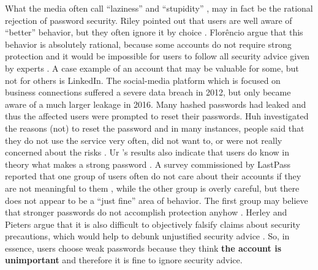 	What the media often call ``laziness'' and ``stupidity'' \cite{Volkamer2013MentalModels}, may in fact be the rational rejection of password security. Riley pointed out that users are well aware of ``better'' behavior, but they often ignore it by choice \cite{Riley2006WhatUsersKnowWhatTheyDo}. Florêncio \etal argue that this behavior is absolutely rational, because some accounts do not require strong protection and it would be impossible for users to follow all security advice given by experts \cite{Florencio2014PasswordPortfoliosFiniteUser}. A case example of an account that may be valuable for some, but not for others is LinkedIn. The social-media platform which is focused on business connections suffered a severe data breach in 2012, but only became aware of a much larger leakage in 2016. Many hashed passwords had leaked and thus the affected users were prompted to reset their passwords. Huh \etal investigated the reasons (not) to reset the password and in many instances, people said that they do not use the service very often, did not want to, or were not really concerned about the risks \cite{Huh2017TooBusy}. Ur \etal's results also indicate that users do know in theory what makes a strong password \cite{Ur2016PerceptionsPassword}. A survey commissioned by LastPass reported that one group of users often do not care about their accounts if they are not meaningful to them \cite{LastPass2016PersonalitiesGetUsHacked}, while the other group is overly careful, but there does not appear to be a ``just fine'' area of behavior. The first group may believe that stronger passwords do not accomplish protection anyhow \cite{Florencio2007DoStrongWebPasswords}. Herley and Pieters argue that it is also difficult to objectively falsify claims about security precautions, which would help to debunk unjustified security advice \cite{Herley2015Counterfactuals}. So, in essence, users choose weak passwords because they think \textbf{the account is unimportant} and therefore it is fine to ignore security advice.  

